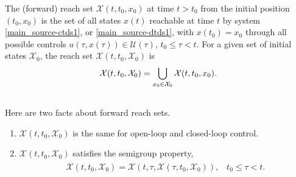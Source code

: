 \documentclass[letterpaper,10pt,english]{sphinxmanual}
\begin{document}
The (forward) reach set ${\mathcal X}(t, t_0, x_0)$ at time
$t>t_0$ from the initial position $(t_0, x_0)$ is the set of
all states $x(t)$ reachable at time $t$ by system \eqref{main_source-ctds1},
or \eqref{main_source-dtds1}, with $x(t_0)=x_0$ through all possible controls
$u(\tau, x(\tau))\in{\mathcal U}(\tau)$,
$t_0\leqslant\tau< t$. For a given set of initial states
${\mathcal X}_0$, the reach set
${\mathcal X}(t, t_0, {\mathcal X}_0)$ is
\begin{gather}
\begin{split}{\mathcal X}(t, t_0, {\mathcal X}_0) = \bigcup_{x_0\in{\mathcal X}_0}{\mathcal X}(t, t_0, x_0).\end{split}\notag\\\begin{split}\end{split}\notag
\end{gather}
Here are two facts about forward reach sets.
\begin{enumerate}
\item {} 
${\mathcal X}(t, t_0, {\mathcal X}_0)$ is the same for
open-loop and closed-loop control.

\item {} 
${\mathcal X}(t, t_0, {\mathcal X}_0)$ satisfies the semigroup
property,
\label{main_source:equation-semigroup}\begin{gather}
\begin{split}{\mathcal X}(t, t_0, {\mathcal X}_0) = {\mathcal X}(t, \tau, {\mathcal X}(\tau, t_0, {\mathcal X}_0)), \;\;\;
t_0\leqslant\tau< t.\end{split}\label{main_source-semigroup}
\end{gather}
\end{enumerate}
\end{document}
